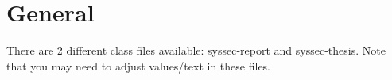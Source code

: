 \chapter{General}

There are 2 different class files available: syssec-report and syssec-thesis.
Note that you may need to adjust values/text in these files.
